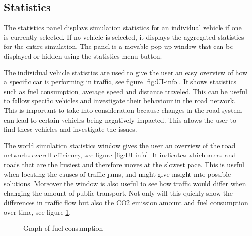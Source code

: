         
    \subsection{Statistics}
        The statistics panel displays simulation statistics for an individual vehicle if one is currently selected. If no vehicle is selected, it displays the aggregated statistics for the entire simulation. The panel is a movable pop-up window that can be displayed or hidden using the statistics menu button.

        The individual vehicle statistics are used to give the user an easy overview of how a specific car is performing in traffic, see figure \ref{fig:UI-info}. It shows statistics such as fuel consumption, average speed and distance traveled. This can be useful to follow specific vehicles and investigate their behaviour in the road network. This is important to take into consideration because changes in the road system can lead to certain vehicles being negatively impacted. This allows the user to find these vehicles and investigate the issues.


        The world simulation statistics window gives the user an overview of the road networks overall efficiency, see figure \ref{fig:UI-info}. It indicates which areas and roads that are the busiest and therefore moves at the slowest pace. This is useful when locating the causes of traffic jams, and might give insight into possible solutions. Moreover the window is also useful to see how traffic would differ when changing the amount of public transport. Not only will this quickly show the differences in traffic flow but also the CO2 emission amount and fuel consumption over time, see figure \ref{fig:Emissions}.
    
    \begin{figure}[ht]
        \centering
        \caption{Graph of fuel consumption}
        \label{fig:Emissions}
    \end{figure}


